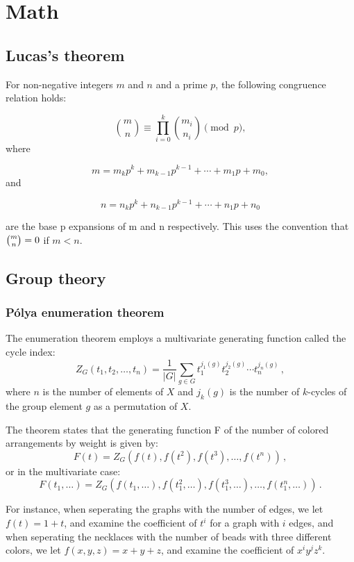\chapter{Math}

\section{Lucas's theorem}

For non-negative integers $m$ and $n$ and a prime $p$, the following congruence relation holds:

$${\displaystyle {\binom {m}{n}}\equiv \prod _{i=0}^{k}{\binom {m_{i}}{n_{i}}}{\pmod {p}},}$$
where

$${\displaystyle m=m_{k}p^{k}+m_{k-1}p^{k-1}+\cdots +m_{1}p+m_{0},}$$
and

$${\displaystyle n=n_{k}p^{k}+n_{k-1}p^{k-1}+\cdots +n_{1}p+n_{0}}$$

are the base p expansions of m and n respectively. This uses the convention that ${\displaystyle {\tbinom {m}{n}}=0}$ if $m < n$.

\section{Group theory}
	\subsection{Pólya enumeration theorem}
		The enumeration theorem employs a multivariate generating function called the cycle index:
		$$Z_{G}(t_{1},t_{2},\ldots ,t_{n})={\frac {1}{|G|}}\sum _{g\in G}t_{1}^{j_{1}(g)}t_{2}^{j_{2}(g)}\cdots t_{n}^{j_{n}(g)}\,,$$
		where $n$ is the number of elements of $X$ and $j_k(g)$ is the number of $k$-cycles of the group element $g$ as a permutation of $X$.

		The theorem states that the generating function F of the number of colored arrangements by weight is given by:
		$$F(t)=Z_{G}(f(t),f(t^{2}),f(t^{3}),\ldots ,f(t^{n}))\,,$$
		or in the multivariate case:
		$$F(t_{1},\ldots )=Z_{G}(f(t_{1},\ldots ),f(t_{1}^{2},\ldots ),f(t_{1}^{3},\ldots ),\ldots ,f(t_{1}^{n},\ldots ))\,.$$

		For instance, when seperating the graphs with the number of edges, we let $f(t)=1+t$, and examine the coefficient of $t^i$ for a graph with $i$ edges, and when seperating the necklaces with the number of beads with three different colors, we let $f(x,y,z)=x+y+z$, and examine the coefficient of $x^iy^jz^k$.

